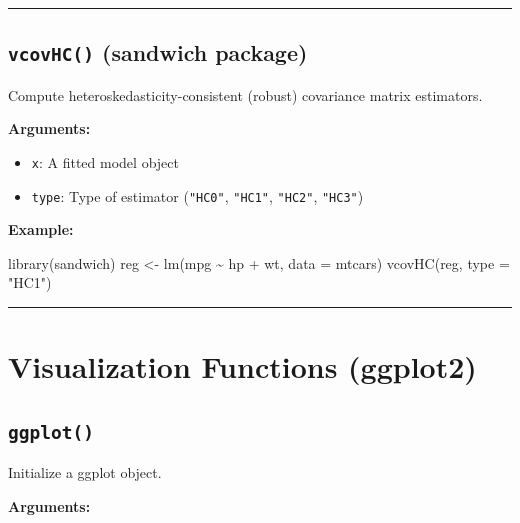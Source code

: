 \documentclass[
  letterpaper,
  DIV=11,
  numbers=noendperiod]{scrreprt}
\newenvironment{Shaded}{\begin{snugshade}}{\end{snugshade}}
\newcommand{\AttributeTok}[1]{\textcolor[rgb]{0.40,0.45,0.13}{#1}}
\newcommand{\FunctionTok}[1]{\textcolor[rgb]{0.28,0.35,0.67}{#1}}
\newcommand{\NormalTok}[1]{\textcolor[rgb]{0.00,0.23,0.31}{#1}}
\newcommand{\OtherTok}[1]{\textcolor[rgb]{0.00,0.23,0.31}{#1}}
\newcommand{\SpecialCharTok}[1]{\textcolor[rgb]{0.37,0.37,0.37}{#1}}
\newcommand{\StringTok}[1]{\textcolor[rgb]{0.13,0.47,0.30}{#1}}
\providecommand{\tightlist}{%
  \setlength{\itemsep}{0pt}\setlength{\parskip}{0pt}}
\begin{document}
\begin{center}\rule{0.5\linewidth}{0.5pt}\end{center}

\subsection{\texorpdfstring{\texttt{vcovHC()} (sandwich
package)}{vcovHC() (sandwich package)}}\label{vcovhc-sandwich-package}

Compute heteroskedasticity-consistent (robust) covariance matrix
estimators.

\textbf{Arguments:}

\begin{itemize}
\tightlist
\item
  \texttt{x}: A fitted model object
\item
  \texttt{type}: Type of estimator (\texttt{"HC0"}, \texttt{"HC1"},
  \texttt{"HC2"}, \texttt{"HC3"})
\end{itemize}

\textbf{Example:}

\begin{Shaded}
\begin{Highlighting}[]
\FunctionTok{library}\NormalTok{(sandwich)}
\NormalTok{reg }\OtherTok{\textless{}{-}} \FunctionTok{lm}\NormalTok{(mpg }\SpecialCharTok{\textasciitilde{}}\NormalTok{ hp }\SpecialCharTok{+}\NormalTok{ wt, }\AttributeTok{data =}\NormalTok{ mtcars)}
\FunctionTok{vcovHC}\NormalTok{(reg, }\AttributeTok{type =} \StringTok{"HC1"}\NormalTok{)}
\end{Highlighting}
\end{Shaded}

\begin{center}\rule{0.5\linewidth}{0.5pt}\end{center}

\section{Visualization Functions
(ggplot2)}\label{visualization-functions-ggplot2}

\subsection{\texorpdfstring{\texttt{ggplot()}}{ggplot()}}\label{ggplot}

Initialize a ggplot object.

\textbf{Arguments:}
\end{document}

